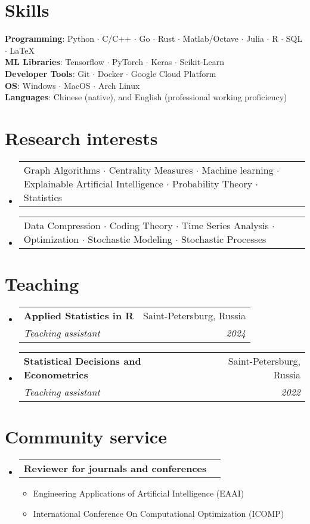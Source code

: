 \documentclass[letterpaper,10pt]{article}
\makeatletter
\newcommand{\resumeItem}[1]{
  \item\small{
    {#1 \vspace{-2pt}}
  }
}
\newcommand{\resumeSubheading}[4]{
  \vspace{-2pt}\item
  \begin{tabular*}{0.97\textwidth}[t]{l@{\extracolsep{\fill}}r}
    \textbf{#1} & #2 \\
    \textit{\small#3} & \textit{\small #4} \\
  \end{tabular*}\vspace{-7pt}
}
\newcommand{\resumeProjectHeading}[2]{
  \item
  \begin{tabular*}{0.97\textwidth}{l@{\extracolsep{\fill}}r}
    \small#1 & #2 \\
  \end{tabular*}\vspace{-7pt}
}
\newenvironment{resumeSubHeadingList}{\begin{itemize}[leftmargin=0.15in, label={}]}{\end{itemize}}
\newenvironment{resumeItemList}{\begin{itemize}}{\end{itemize}}
\makeatother
\begin{document}
\section{Skills}
\begin{itemize}[leftmargin=0.15in, label={}]
  \small{\item{
        \textbf{Programming}{: Python $\cdot$ C/C++ $\cdot$ Go $\cdot$ Rust $\cdot$ Matlab/Octave $\cdot$ Julia $\cdot$ R $\cdot$ SQL $\cdot$ \LaTeX} \\
        \textbf{ML Libraries}{: Tensorflow $\cdot$  PyTorch $\cdot$ Keras $\cdot$  Scikit-Learn} \\
        \textbf{Developer Tools}{: Git $\cdot$ Docker $\cdot$  Google Cloud Platform} \\
        \textbf{OS}{: Windows $\cdot$ MacOS $\cdot$ Arch Linux} \\
        \textbf{Languages}{: Chinese (native), and English (professional working proficiency)}
        }}
\end{itemize}

\section{Research interests}
\begin{resumeSubHeadingList}
  \resumeProjectHeading{
    Graph Algorithms $\cdot$ Centrality Measures $\cdot$ Machine learning
    $\cdot$ Explainable Artificial Intelligence $\cdot$ Probability Theory
    $\cdot$ Statistics}{}
  \resumeProjectHeading{
    Data Compression $\cdot$ Coding Theory $\cdot$ Time Series Analysis $\cdot$
    Optimization $\cdot$ Stochastic Modeling $\cdot$ Stochastic Processes}{}
\end{resumeSubHeadingList}
\section{Teaching}
\begin{resumeSubHeadingList}
  \resumeSubheading{Applied Statistics in R}{Saint-Petersburg, Russia}{Teaching
                    assistant}{2024}
  \resumeSubheading{Statistical Decisions and Econometrics}{Saint-Petersburg,
                    Russia}{Teaching assistant}{2022}
\end{resumeSubHeadingList}
\section{Community service}
\begin{resumeSubHeadingList}
  \resumeProjectHeading{{\bf Reviewer for journals and conferences}}{}
  \begin{resumeItemList}
    \resumeItem{Engineering Applications of Artificial Intelligence (EAAI)}
    \resumeItem{International Conference On Computational Optimization (ICOMP)}
  \end{resumeItemList}
\end{resumeSubHeadingList}
\end{document}
